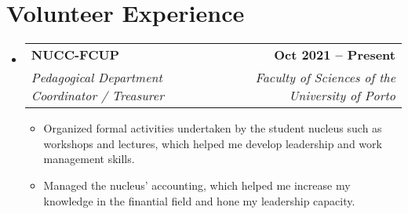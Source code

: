 \documentclass[letterpaper,11pt]{article}
\makeatletter
\newcommand{\resumeItem}[1]{
  \item\small{
    {#1 \vspace{-2pt}}
  }
}
\newcommand{\resumeSubheading}[4]{
  \vspace{-2pt}\item
    \begin{tabular*}{1.0\textwidth}[t]{l@{\extracolsep{\fill}}r}
      \textbf{#1} & \textbf{\small #2} \\
      \textit{\small#3} & \textit{\small #4} \\
    \end{tabular*}\vspace{-7pt}
}
\newcommand{\resumeSubHeadingListStart}{\begin{itemize}[leftmargin=0.0in, label={}]}
\newcommand{\resumeSubHeadingListEnd}{\end{itemize}}
\newcommand{\resumeItemListStart}{\begin{itemize}}
\newcommand{\resumeItemListEnd}{\end{itemize}\vspace{-5pt}}
\makeatother
\begin{document}
\section{Volunteer Experience}
    \resumeSubHeadingListStart
        \resumeSubheading{NUCC-FCUP}{Oct 2021 -- Present}{Pedagogical Department Coordinator / Treasurer}{Faculty of Sciences of the University of Porto}
            \resumeItemListStart
                \resumeItem{Organized formal activities undertaken by the student nucleus such as workshops and lectures, which helped me develop leadership and work management skills.}
                \resumeItem{Managed the nucleus' accounting, which helped me increase my knowledge in the finantial field and hone my leadership capacity.}
            \resumeItemListEnd
  \resumeSubHeadingListEnd
\vspace{-16pt}

\end{document}
